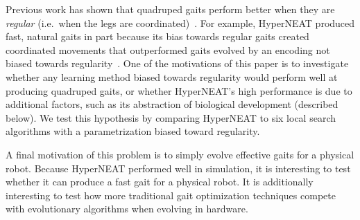 Previous work has shown that quadruped gaits perform better when they
are \emph{regular} (i.e.\ when the legs are
coordinated)~\cite{clune2009evolving,
  clune2011performance,valsalam2008modular}. For example, HyperNEAT
produced fast, natural gaits in part because its bias towards regular
gaits created coordinated movements that outperformed gaits evolved by
an encoding not biased towards regularity~\cite{clune2009evolving,
  clune2011performance}. One of the motivations of this paper is to
investigate whether any learning method biased towards regularity
would perform well at producing quadruped gaits, or whether
HyperNEAT's high performance is due to additional factors, such as its
abstraction of biological development (described below). We test this
hypothesis by comparing HyperNEAT to six local search algorithms with
a parametrization biased toward regularity.

A final motivation of this problem is to simply evolve effective gaits
for a physical robot. Because HyperNEAT performed well in simulation,
it is interesting to test whether it can produce a fast gait for a
physical robot. It is additionally interesting to test how more
traditional gait optimization techniques compete with evolutionary
algorithms when evolving in hardware.




%  
%  
% 

